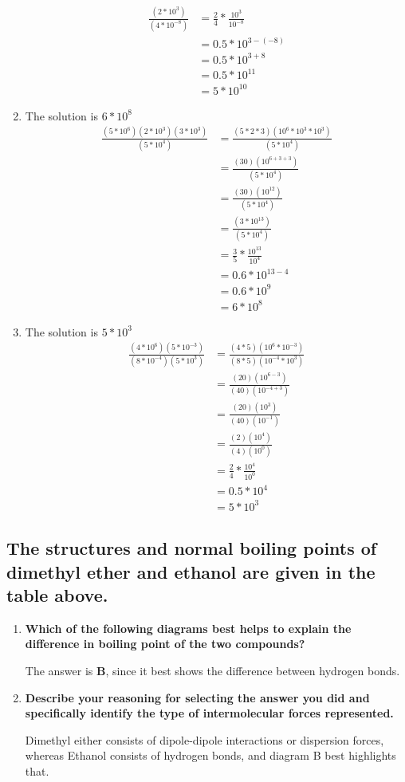 \documentclass[11pt]{article}
\begin{document}
\begin{enumerate}
\begin{align*}
\frac{(2*10^3)}{(4*10^{-8})}&=\frac{2}{4}*\frac{10^3}{10^{-8}}\\
&=0.5*10^{3-(-8)}\\
&=0.5*10^{3+8}\\
&=0.5*10^{11}\\
&=5*10^{10}
\end{align*}
\item The solution is \(6*10^8\)
\begin{align*}
\frac{(5*10^6)(2*10^3)(3*10^3)}{(5*10^4)}&=\frac{(5*2*3)(10^6*10^3*10^3)}{(5*10^4)}\\
&=\frac{(30)(10^{6+3+3})}{(5*10^4)}\\
&=\frac{(30)(10^{12})}{(5*10^4)}\\
&=\frac{(3*10^{13})}{(5*10^4)}\\
&=\frac{3}{5}*\frac{10^{13}}{10^4}\\
&=0.6*10^{13-4}\\
&=0.6*10^9\\
&=6*10^8
\end{align*}
\item The solution is \(5*10^3^{}\)
\begin{align*}
\frac{(4*10^6)(5*10^{-3})}{(8*10^{-4})(5*10^3)}&=\frac{(4*5)(10^6*10^{-3})}{(8*5)(10^{-4}*10^3)}\\
&=\frac{(20)(10^{6-3}^{})}{(40)(10^{-4+3})}\\
&=\frac{(20)(10^3)}{(40)(10^{-1})}^{}\\
&=\frac{(2)(10^4)}{(4)(10^0)}^{}\\
&=\frac{2}{4}*\frac{10^4}{10^0}\\
&=0.5*10^4\\
&=5*10^3
\end{align*}
\end{enumerate}

\subsection{The structures and normal boiling points of dimethyl ether and ethanol are given in the table above.}
\label{sec:orgc9f9aff}
\begin{enumerate}
\item \textbf{Which of the following diagrams best helps to explain the difference in boiling point of the two compounds?}

The answer is \textbf{B}, since it best shows the difference between hydrogen bonds.

\item \textbf{Describe your reasoning for selecting the answer you did and specifically identify the type of intermolecular forces represented.}

Dimethyl either consists of dipole-dipole interactions or dispersion forces, whereas Ethanol consists of hydrogen bonds, and diagram B best highlights that.
\end{enumerate}
\end{document}
